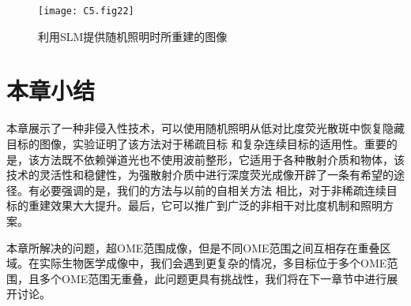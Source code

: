 \begin{figure}[htp]
	\centering
	\texttt{[image: C5.fig22]}
	\caption{利用SLM提供随机照明时所重建的图像}
	\label{fig:5.22}
\end{figure}

\section{本章小结}

本章展示了一种非侵入性技术，可以使用随机照明从低对比度荧光散斑中恢复隐藏目标的图像，实验证明了该方法对于稀疏目标 和复杂连续目标的适用性。重要的是，该方法既不依赖弹道光也不使用波前整形，它适用于各种散射介质和物体，该技术的灵活性和稳健性，为强散射介质中进行深度荧光成像开辟了一条有希望的途径。有必要强调的是，我们的方法与以前的自相关方法 \cite{bertolotti_non-invasive_2012,katz_non-invasive_2014} 相比，对于非稀疏连续目标的重建效果大大提升。最后，它可以推广到广泛的非相干对比度机制和照明方案。

本章所解决的问题，超OME范围成像，但是不同OME范围之间互相存在重叠区域。在实际生物医学成像中，我们会遇到更复杂的情况，多目标位于多个OME范围，且多个OME范围无重叠，此问题更具有挑战性，我们将在下一章节中进行展开讨论。
